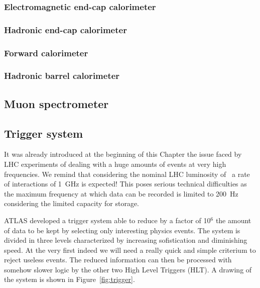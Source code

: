 \subsubsection{Electromagnetic end-cap calorimeter}\label{sec:emcalendcap}


\subsubsection{Hadronic end-cap calorimeter}\label{sec:hadcalendcap}


\subsubsection{Forward calorimeter}\label{sec:calforward}


\subsubsection{Hadronic barrel calorimeter}\label{sec:hadcalbarrel}


\subsection{Muon spectrometer}\label{sec:muonspec}

\subsection{Trigger system}\label{sec:trigger}

It was already introduced at the beginning of this Chapter the issue
faced by LHC experiments of dealing with a huge amounts of events
at very high frequencies. We remind that considering the nominal LHC
luminosity of \highL\ a rate of interactions of 1~GHz is expected!
This poses serious technical difficulties as the maximum frequency
at which data can be recorded is limited to 200~Hz considering the
limited capacity for storage.

ATLAS developed a trigger system able to reduce by a factor of 10$^6$
the amount of data to be kept by selecting only interesting physics events.
The system is divided in three levels characterized by increasing sofistication
and diminishing speed. At the very first indeed we will need a really quick and
simple criterium to reject useless events. The reduced information can then be
processed with somehow slower logic by the other two High Level Triggers (HLT).
A drawing of the system is shown in Figure~\ref{fig:trigger}.

